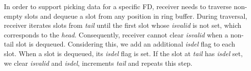 In order to support picking data for a specific FD, receiver needs to traverse non-empty slots and dequeue a slot from any position in ring buffer. During traversal, receiver iterates slots from \textit{tail} until the first slot whose \textit{isvalid} is not set, which corresponds to the \textit{head}. Consequently, receiver cannot clear \textit{isvalid} when a non-tail slot is dequeued. Considering this, we add an additional \textit{isdel} flag to each slot. When a slot is dequeued, its \textit{isdel} flag is set. If the slot at \textit{tail} has \textit{isdel} set, we clear \textit{isvalid} and \textit{isdel}, increments \textit{tail} and repeats this step.









